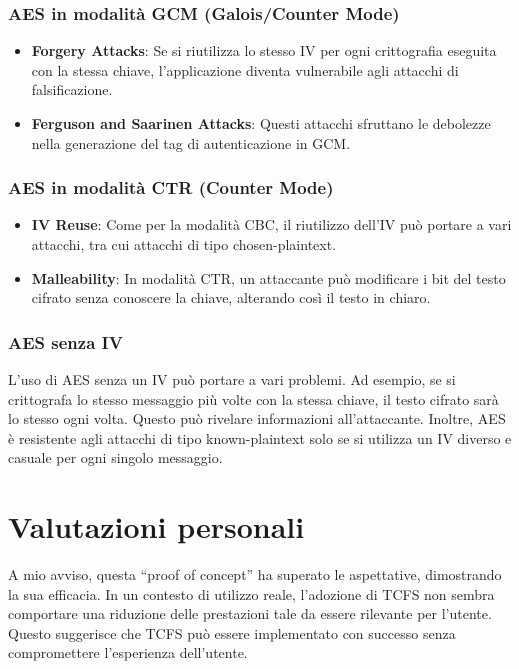 \subsubsection{AES in modalità GCM (Galois/Counter Mode)}
\begin{itemize}
    \item \textbf{Forgery Attacks}: Se si riutilizza lo stesso IV per ogni crittografia eseguita con la stessa chiave, l’applicazione diventa vulnerabile agli attacchi di falsificazione. \cite{ForgeryAttacksOnGCM}
    \item \textbf{Ferguson and Saarinen Attacks}: Questi attacchi sfruttano le debolezze nella generazione del tag di autenticazione in GCM. \cite{CyclicAttackMACs}
\end{itemize}
\subsubsection{AES in modalità CTR (Counter Mode)}
\begin{itemize}
    \item \textbf{IV Reuse}: Come per la modalità CBC, il riutilizzo dell’IV può portare a vari attacchi, tra cui attacchi di tipo chosen-plaintext. \cite{ZeroDaysAttachDetection}
    \item \textbf{Malleability}: In modalità CTR, un attaccante può modificare i bit del testo cifrato senza conoscere la chiave, alterando così il testo in chiaro. \cite{ZeroDaysAttachDetection}
\end{itemize}
\subsubsection{AES senza IV}
L’uso di AES senza un IV può portare a vari problemi. Ad esempio, se si crittografa lo stesso messaggio più volte con la stessa chiave, il testo cifrato sarà lo stesso ogni volta. Questo può rivelare informazioni all’attaccante. \cite{DeepL-AES-KeyDecryption}
Inoltre, AES è resistente agli attacchi di tipo known-plaintext solo se si utilizza un IV diverso e casuale per ogni singolo messaggio. \cite{SideChannelAnalisys}

\section{Valutazioni personali}
A mio avviso, questa “proof of concept” ha superato le aspettative, dimostrando la sua efficacia. In un contesto di utilizzo reale, l’adozione di TCFS non sembra comportare una riduzione delle prestazioni tale da essere rilevante per l’utente. Questo suggerisce che TCFS può essere implementato con successo senza compromettere l’esperienza dell’utente.